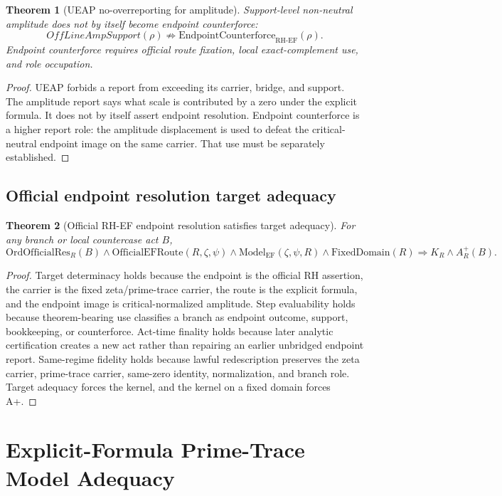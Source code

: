 \documentclass[11pt]{article}
\newtheorem{theorem}{Theorem}[section]
\newcommand{\RH}{\mathrm{RH}}
\newcommand{\EF}{\mathrm{EF}}
\newcommand{\FixedDomain}{\mathrm{FixedDomain}}
\newcommand{\Aplus}{A^+}
\newcommand{\ModelEF}{\mathrm{Model}_{\mathrm{EF}}}
\newcommand{\OfficialEFRoute}{\mathrm{OfficialEFRoute}}
\newcommand{\Counterforce}{\mathrm{EndpointCounterforce}}
\newcommand{\OrdOfficialRes}{\mathrm{OrdOfficialRes}}
\begin{document}
\begin{theorem}[UEAP no-overreporting for amplitude]
Support-level non-neutral amplitude does not by itself become endpoint counterforce:
\[
OffLineAmpSupport(\rho)\not\Rightarrow \Counterforce_{\RH\text{-}\EF}(\rho).
\]
Endpoint counterforce requires official route fixation, local exact-complement use, and role occupation.
\end{theorem}

\begin{proof}
UEAP forbids a report from exceeding its carrier, bridge, and support.  The amplitude report says what scale is contributed by a zero under the explicit formula.  It does not by itself assert endpoint resolution.  Endpoint counterforce is a higher report role: the amplitude displacement is used to defeat the critical-neutral endpoint image on the same carrier.  That use must be separately established.
\end{proof}

\subsection{Official endpoint resolution target adequacy}

\begin{theorem}[Official RH-EF endpoint resolution satisfies target adequacy]
For any branch or local countercase act \(B\),
\[
\OrdOfficialRes_R(B)\wedge \OfficialEFRoute(R,\zeta,\psi)\wedge \ModelEF(\zeta,\psi,R)\wedge \FixedDomain(R)
\Rightarrow K_R\wedge \Aplus_R(B).
\]
\end{theorem}

\begin{proof}
Target determinacy holds because the endpoint is the official RH assertion, the carrier is the fixed zeta/prime-trace carrier, the route is the explicit formula, and the endpoint image is critical-normalized amplitude.  Step evaluability holds because theorem-bearing use classifies a branch as endpoint outcome, support, bookkeeping, or counterforce.  Act-time finality holds because later analytic certification creates a new act rather than repairing an earlier unbridged endpoint report.  Same-regime fidelity holds because lawful redescription preserves the zeta carrier, prime-trace carrier, same-zero identity, normalization, and branch role.  Target adequacy forces the kernel, and the kernel on a fixed domain forces A+.
\end{proof}

\section{Explicit-Formula Prime-Trace Model Adequacy}
\end{document}
